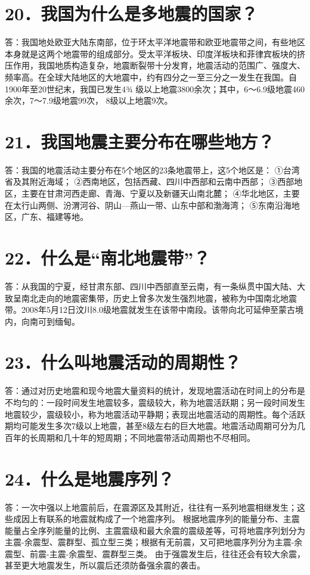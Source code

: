 \documentclass[a4paper,12pt,english]{sphinxmanual}
\begin{document}
\section{20．我国为什么是多地震的国家？}
\label{\detokenize{index:id22}}
答：我国地处欧亚大陆东南部，位于环太平洋地震带和欧亚地震带之间，有些地区本身就是这两个地震带的组成部分。受太平洋板块、印度洋板块和菲律宾板块的挤压作用，我国地质构造复杂，地震断裂带十分发育，地震活动的范围广、强度大、频率高。在全球大陆地区的大地震中，约有四分之一至三分之一发生在我国。自1900年至20世纪末，我国已发生4¾ 级以上地震3800余次；其中，6～6.9级地震460余次，7～7.9级地震99次， 8级以上地震9次。


\section{21．我国地震主要分布在哪些地方？}
\label{\detokenize{index:id23}}
答：我国的地震活动主要分布在5个地区的23条地震带上，这5个地区是：
①台湾省及其附近海域；
②西南地区，包括西藏、四川中西部和云南中西部；
③西部地区，主要在甘肃河西走廊、青海、宁夏以及新疆天山南北麓；
④华北地区，主要在太行山两侧、汾渭河谷、阴山—燕山一带、山东中部和渤海湾；
⑤东南沿海地区，广东、福建等地。


\section{22．什么是“南北地震带”？}
\label{\detokenize{index:id24}}
答：从我国的宁夏，经甘肃东部、四川中西部直至云南，有一条纵贯中国大陆、大致呈南北走向的地震密集带，历史上曾多次发生强烈地震，被称为中国南北地震带。2008年5月12日汶川8.0级地震就发生在该带中南段。该带向北可延伸至蒙古境内，向南可到缅甸。


\section{23．什么叫地震活动的周期性？}
\label{\detokenize{index:id25}}
答：通过对历史地震和现今地震大量资料的统计，发现地震活动在时间上的分布是不均匀的：一段时间发生地震较多，震级较大，称为地震活跃期；另一段时间发生地震较少，震级较小，称为地震活动平静期；表现出地震活动的周期性。每个活跃期均可能发生多次7级以上地震，甚至8级左右的巨大地震。地震活动周期可分为几百年的长周期和几十年的短周期；不同地震带活动周期也不尽相同。


\section{24．什么是地震序列？}
\label{\detokenize{index:id26}}
答：一次中强以上地震前后，在震源区及其附近，往往有一系列地震相继发生；这些成因上有联系的地震就构成了一个地震序列。
根据地震序列的能量分布、主震能量占全序列能量的比例、主震震级和最大余震的震级差等，可将地震序列划分为主震-余震型、震群型、孤立型三类；根据有无前震，又可把地震序列分为主震-余震型、前震-主震-余震型、震群型三类。
由于强震发生后，往往还会有较大余震，甚至更大地震发生，所以震后还须防备强余震的袭击。
\end{document}
